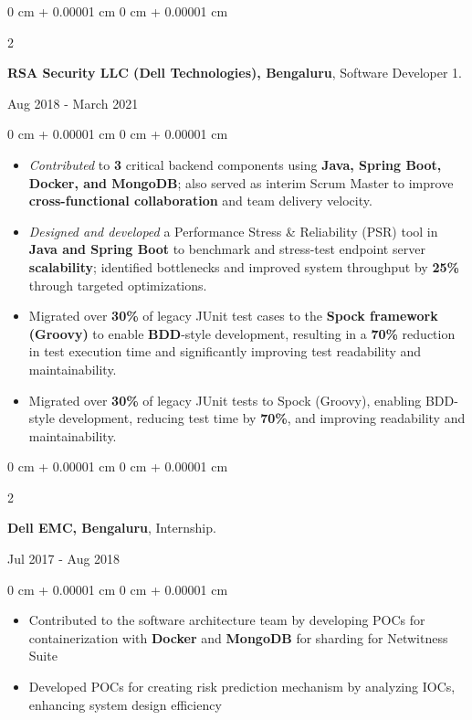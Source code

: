 \documentclass[10pt, letterpaper]{article}
\newenvironment{highlights}{
    \begin{itemize}[
        topsep=0.10 cm,
        parsep=0.10 cm,
        partopsep=0pt,
        itemsep=0pt,
        leftmargin=0 cm + 10pt
    ]
}{
    \end{itemize}
} %
\newenvironment{onecolentry}{
    \begin{adjustwidth}{
        0 cm + 0.00001 cm
    }{
        0 cm + 0.00001 cm
    }
}{
    \end{adjustwidth}
} %
\newenvironment{twocolentry}[2][]{
    \onecolentry
    \def\secondColumn{#2}
    \setcolumnwidth{\fill, 4.5 cm}
    \begin{paracol}{2}
}{
    \switchcolumn \raggedleft \secondColumn
    \end{paracol}
    \endonecolentry
} %
\begin{document}
        \vspace{0.2 cm}

        \begin{twocolentry}{Aug 2018 - March 2021}
         \textbf{RSA Security LLC (Dell Technologies), Bengaluru}, Software Developer 1.
        \end{twocolentry}
        \vspace{0.10 cm}
        \begin{onecolentry}
          \begin{highlights}
\item \textit{Contributed} to \textbf{3} critical backend components using \textbf{Java, Spring Boot, Docker, and MongoDB}; also served as interim Scrum Master to improve \textbf{cross-functional collaboration} and team delivery velocity.

\item \textit{Designed and developed} a Performance Stress \& Reliability (PSR) tool in \textbf{Java and Spring Boot} to benchmark and stress-test endpoint server \textbf{scalability}; identified bottlenecks and improved system throughput by \textbf{25\%} through targeted optimizations.

\item Migrated over \textbf{30\%} of legacy JUnit test cases to the \textbf{Spock framework (Groovy)} to enable \textbf{BDD}-style development, resulting in a \textbf{70\%} reduction in test execution time and significantly improving test readability and maintainability.

\item Migrated over \textbf{30\%} of legacy JUnit tests to Spock (Groovy), enabling BDD-style development, reducing test time by \textbf{70\%}, and improving readability and maintainability.

 \end{highlights}
        \end{onecolentry}

        \vspace{0.2 cm}

        \begin{twocolentry}{Jul 2017 - Aug 2018}
            \textbf{Dell EMC, Bengaluru}, Internship.
        \end{twocolentry}
        \vspace{0.10 cm}
        \begin{onecolentry}
          \begin{highlights}
                \item Contributed to the software architecture team by developing POCs for containerization with \textbf{Docker} and \textbf{MongoDB} for sharding for Netwitness Suite
                \item Developed POCs for creating risk prediction mechanism by analyzing IOCs, enhancing system design efficiency
            \end{highlights}
        \end{onecolentry}
\end{document}
